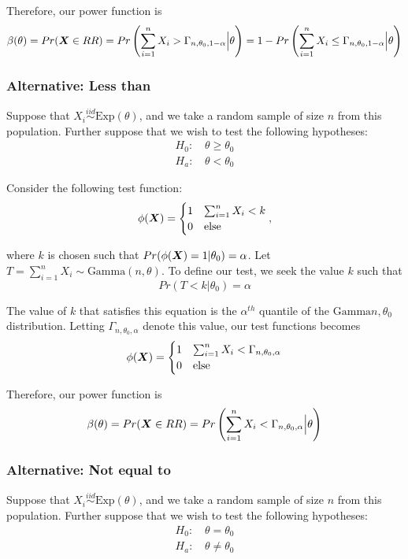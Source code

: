 \documentclass[]{article}
\newcommand{\bfX}{\mbox{\boldmath $X$}}
\begin{document}
Therefore, our power function is
\[
\beta(\theta) = Pr(\bfX \in RR) = Pr\left(\sum_{i=1}^n X_i > \Gamma_{n, \theta_0, 1-\alpha} \Big| \theta\right) = 1 - Pr\left(\sum_{i=1}^n X_i \leq \Gamma_{n, \theta_0, 1-\alpha} \Big| \theta\right)
\]

\subsubsection{Alternative: Less than}

Suppose that $X_i \stackrel{iid}{\sim} \text{Exp}(\theta)$, and we take a random sample of size $n$ from this population. Further suppose that we wish to test the following hypotheses:
\[
\begin{split}
\text{$H_0$: }& \theta \geq \theta_0 \\
\text{$H_a$: }& \theta < \theta_0
\end{split}
\]

Consider the following test function:
\[
\phi(\bfX) = \begin{cases}
1 & \sum_{i=1}^n X_i < k \\
0 & \text{else}
\end{cases},
\]

where $k$ is chosen such that $Pr(\phi(\bfX) = 1|\theta_0) = \alpha$. Let $T = \sum_{i=1}^n X_i \sim \text{Gamma}(n, \theta)$. To define our test, we seek the value $k$ such that 
\[
Pr(T < k | \theta_0) = \alpha
\]

The value of $k$ that satisfies this equation is the $\alpha^{th}$ quantile of the $\text{Gamma}{n, \theta_0}$ distribution. Letting $\Gamma_{n, \theta_0, \alpha}$ denote this value, our test functions becomes
\[
\phi(\bfX) = \begin{cases}
1 & \sum_{i=1}^n X_i < \Gamma_{n, \theta_0, \alpha} \\
0 & \text{else}
\end{cases}
\]

Therefore, our power function is
\[
\beta(\theta) = Pr(\bfX \in RR) = Pr\left(\sum_{i=1}^n X_i < \Gamma_{n, \theta_0, \alpha} \Big| \theta\right) 
\]

\subsubsection{Alternative: Not equal to}

Suppose that $X_i \stackrel{iid}{\sim} \text{Exp}(\theta)$, and we take a random sample of size $n$ from this population. Further suppose that we wish to test the following hypotheses:
\[
\begin{split}
\text{$H_0$: }& \theta = \theta_0 \\
\text{$H_a$: }& \theta \neq \theta_0
\end{split}
\]
\end{document}
